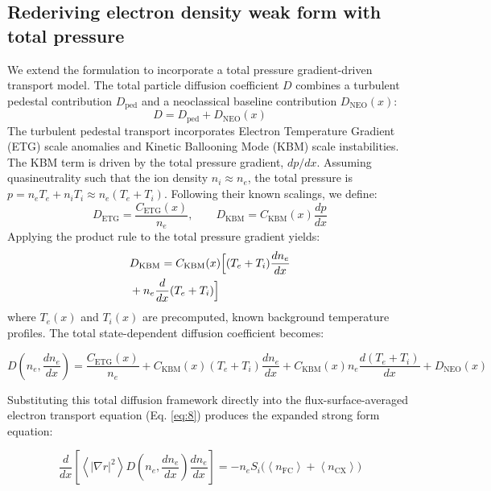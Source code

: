 \documentclass[twocolumn,secnumarabic,amssymb, nobibnotes, aps, prd]{revtex4-2}
\renewcommand{\ne}{n_{e}}  %
\newcommand{\nfc}{n_{\mathrm{FC}}}
\newcommand{\ncx}{n_{\mathrm{CX}}}
\newcommand{\Si}{S_{i}}
\newcommand{\Dped}{D_{\mathrm{ped}}}
\newcommand{\fsa}[1]{\left\langle #1 \right\rangle}
\newcommand{\gradrsq}{\fsa{|\nabla r|^{2}}}
\begin{document}
\subsection{Rederiving electron density weak form with total pressure}
\label{sec:ne-weak-total-pressure}

We extend the formulation to incorporate a total pressure gradient-driven transport model. The total particle diffusion coefficient $D$ combines a turbulent pedestal contribution $\Dped$ and a neoclassical baseline contribution $D_{\mathrm{NEO}}(x)$:
\begin{equation}
D = \Dped + D_{\mathrm{NEO}}(x)
\end{equation}
The turbulent pedestal transport incorporates Electron Temperature Gradient (ETG) scale anomalies and Kinetic Ballooning Mode (KBM) scale instabilities. The KBM term is driven by the total pressure gradient, $dp/dx$. Assuming quasineutrality such that the ion density $n_i \approx \ne$, the total pressure is $p = \ne T_e + n_i T_i \approx \ne (T_e + T_i)$. Following their known scalings, we define:
\begin{equation}
D_{\mathrm{ETG}} = \frac{C_{\mathrm{ETG}}(x)}{\ne}, \qquad D_{\mathrm{KBM}} = C_{\mathrm{KBM}}(x) \frac{dp}{dx}
\end{equation}
Applying the product rule to the total pressure gradient yields:
\begin{align}
&D_{\mathrm{KBM}} = C_{\mathrm{KBM}}(x) \Big[ (T_e + T_i) \frac{d\ne}{dx} 
\notag \\ & + \ne \frac{d}{dx}(T_e + T_i) \Big]
\end{align}
where $T_e(x)$ and $T_i(x)$ are precomputed, known background temperature profiles. The total state-dependent diffusion coefficient becomes:
\begin{widetext}
\begin{equation}
D\left(\ne, \frac{d\ne}{dx}\right) = \frac{C_{\mathrm{ETG}}(x)}{\ne} + C_{\mathrm{KBM}}(x) (T_e + T_i) \frac{d\ne}{dx} + C_{\mathrm{KBM}}(x) \ne \frac{d(T_e + T_i)}{dx} + D_{\mathrm{NEO}}(x)
\end{equation}
\end{widetext}

Substituting this total diffusion framework directly into the flux-surface-averaged electron transport equation (Eq. \ref{eq:8}) produces the expanded strong form equation:
\begin{widetext}
\begin{equation}
\frac{d}{dx}\left[\gradrsq D\left(\ne, \frac{d\ne}{dx}\right) \frac{d\ne}{dx}\right] = -\ne\Si\bigl(\fsa{\nfc} + \fsa{\ncx}\bigr)
\end{equation}
\end{widetext}
\end{document}
